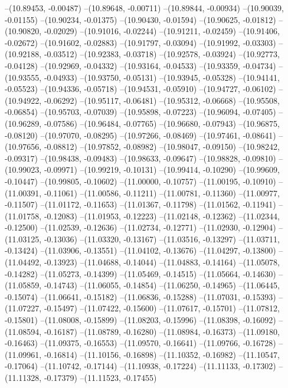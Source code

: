 --(10.89453, -0.00487)
--(10.89648, -0.00711)
--(10.89844, -0.00934)
--(10.90039, -0.01155)
--(10.90234, -0.01375)
--(10.90430, -0.01594)
--(10.90625, -0.01812)
--(10.90820, -0.02029)
--(10.91016, -0.02244)
--(10.91211, -0.02459)
--(10.91406, -0.02672)
--(10.91602, -0.02883)
--(10.91797, -0.03094)
--(10.91992, -0.03303)
--(10.92188, -0.03512)
--(10.92383, -0.03718)
--(10.92578, -0.03924)
--(10.92773, -0.04128)
--(10.92969, -0.04332)
--(10.93164, -0.04533)
--(10.93359, -0.04734)
--(10.93555, -0.04933)
--(10.93750, -0.05131)
--(10.93945, -0.05328)
--(10.94141, -0.05523)
--(10.94336, -0.05718)
--(10.94531, -0.05910)
--(10.94727, -0.06102)
--(10.94922, -0.06292)
--(10.95117, -0.06481)
--(10.95312, -0.06668)
--(10.95508, -0.06854)
--(10.95703, -0.07039)
--(10.95898, -0.07223)
--(10.96094, -0.07405)
--(10.96289, -0.07586)
--(10.96484, -0.07765)
--(10.96680, -0.07943)
--(10.96875, -0.08120)
--(10.97070, -0.08295)
--(10.97266, -0.08469)
--(10.97461, -0.08641)
--(10.97656, -0.08812)
--(10.97852, -0.08982)
--(10.98047, -0.09150)
--(10.98242, -0.09317)
--(10.98438, -0.09483)
--(10.98633, -0.09647)
--(10.98828, -0.09810)
--(10.99023, -0.09971)
--(10.99219, -0.10131)
--(10.99414, -0.10290)
--(10.99609, -0.10447)
--(10.99805, -0.10602)
--(11.00000, -0.10757)
--(11.00195, -0.10910)
--(11.00391, -0.11061)
--(11.00586, -0.11211)
--(11.00781, -0.11360)
--(11.00977, -0.11507)
--(11.01172, -0.11653)
--(11.01367, -0.11798)
--(11.01562, -0.11941)
--(11.01758, -0.12083)
--(11.01953, -0.12223)
--(11.02148, -0.12362)
--(11.02344, -0.12500)
--(11.02539, -0.12636)
--(11.02734, -0.12771)
--(11.02930, -0.12904)
--(11.03125, -0.13036)
--(11.03320, -0.13167)
--(11.03516, -0.13297)
--(11.03711, -0.13424)
--(11.03906, -0.13551)
--(11.04102, -0.13676)
--(11.04297, -0.13800)
--(11.04492, -0.13923)
--(11.04688, -0.14044)
--(11.04883, -0.14164)
--(11.05078, -0.14282)
--(11.05273, -0.14399)
--(11.05469, -0.14515)
--(11.05664, -0.14630)
--(11.05859, -0.14743)
--(11.06055, -0.14854)
--(11.06250, -0.14965)
--(11.06445, -0.15074)
--(11.06641, -0.15182)
--(11.06836, -0.15288)
--(11.07031, -0.15393)
--(11.07227, -0.15497)
--(11.07422, -0.15600)
--(11.07617, -0.15701)
--(11.07812, -0.15801)
--(11.08008, -0.15899)
--(11.08203, -0.15996)
--(11.08398, -0.16092)
--(11.08594, -0.16187)
--(11.08789, -0.16280)
--(11.08984, -0.16373)
--(11.09180, -0.16463)
--(11.09375, -0.16553)
--(11.09570, -0.16641)
--(11.09766, -0.16728)
--(11.09961, -0.16814)
--(11.10156, -0.16898)
--(11.10352, -0.16982)
--(11.10547, -0.17064)
--(11.10742, -0.17144)
--(11.10938, -0.17224)
--(11.11133, -0.17302)
--(11.11328, -0.17379)
--(11.11523, -0.17455)
